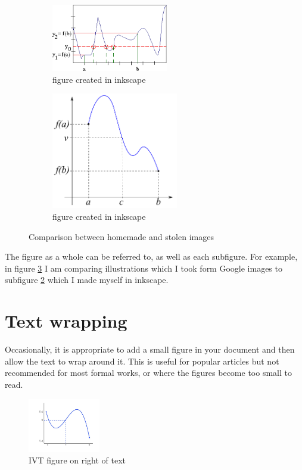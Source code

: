 \documentclass[a4paper,11pt]{article}
\begin{document}
\begin{figure}[htpb]
\begin{subfigure}{.5\textwidth}
  \centering
  \includegraphics[width=2in]{IVT3}
  \caption{figure created in inkscape} %
  \label{fig:IVTgoogleC}  		%
\end{subfigure}
\begin{subfigure}{.5\textwidth}
  \centering
  \includegraphics[height=2in]{IVT4}
  \caption{figure created in inkscape} %
  \label{fig:IVTinkscape}  		%
\end{subfigure}
\caption{Comparison between homemade and stolen images}
\label{fig:IVTsubfigures}
\end{figure}
%
The figure as a whole can be referred to, as well as each subfigure. For example, in figure \ref{fig:IVTsubfigures} I am comparing illustrations which I took form Google images to subfigure \ref{fig:IVTinkscape} which I made myself in inkscape.

\pagebreak

\section{Text wrapping}

Occasionally, it is appropriate to add a small figure in your document and then allow the text to wrap around it. This is useful for popular articles but not recommended for most formal works, or where the figures become too small to read.

\begin{figure}
\centering
\includegraphics[width=0.28\textwidth]{ivt}
\caption{IVT figure on right of text}
\label{fig:IVTright}
\end{figure}
\end{document}
